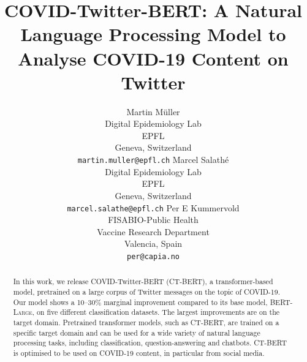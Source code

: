 \documentclass{article}
\title{COVID-Twitter-BERT: A Natural Language Processing Model to Analyse COVID-19 Content on Twitter}
\author{
  Martin M\"uller \\
  Digital Epidemiology Lab \\
  EPFL \\
  Geneva, Switzerland \\
  \texttt{martin.muller@epfl.ch}
    \And
  Marcel Salath\'e \\
  Digital Epidemiology Lab \\
  EPFL \\
  Geneva, Switzerland \\
  \texttt{marcel.salathe@epfl.ch}
    \AND
  Per E Kummervold \\
  FISABIO-Public Health \\
  Vaccine Research Department \\
  Valencia, Spain \\
  \texttt{per@capia.no}
}
\begin{document}
\maketitle

\begin{abstract}
  In this work, we release COVID-Twitter-BERT (\textsc{CT-BERT}), a transformer-based model, pretrained on a large corpus of Twitter messages on the topic of COVID-19.
  Our model shows a \numrange{10}{30}\% marginal improvement compared to its base model, \textsc{BERT-Large}, on five different classification datasets.
  The largest improvements are on the target domain.
  Pretrained transformer models, such as \textsc{CT-BERT}, are trained on a specific target domain and can be used for a wide variety of natural language processing tasks, including classification, question-answering and chatbots.
  \textsc{CT-BERT} is optimised to be used on COVID-19 content, in particular from social media.
\end{abstract}


\end{document}
